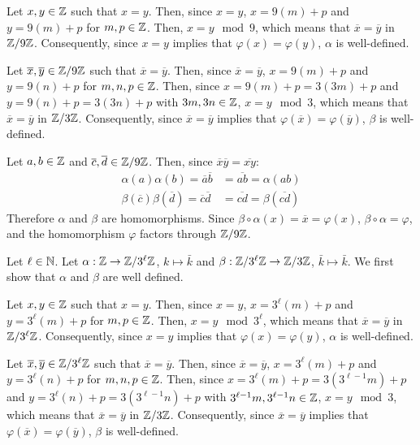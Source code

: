 \documentclass{article}
\begin{document}
Let $x, y \in \mathbb{Z}$ such that $x = y$. Then, since $x = y$, $x = 9\left(m\right) + p$ and $y = 9\left(m\right) + p$ for $m, p \in \mathbb{Z}$. Then, $x = y \mod 9$, which means that $\overline{x} = \overline{y}$ in $\mathbb{Z}/9\mathbb{Z}$. Consequently, since $x = y$ implies that $\varphi\left(x\right) = \varphi\left(y\right)$, $\alpha$ is well-defined.

Let $\overline{x}, \overline{y} \in \mathbb{Z}/9\mathbb{Z}$ such that $\overline{x} = \overline{y}$. Then, since $\overline{x} = \overline{y}$, $x = 9\left(m\right) + p$ and $y = 9\left(n\right) + p$ for $m, n, p \in \mathbb{Z}$. Then, since $x = 9\left(m\right) + p = 3\left(3m\right) + p$ and $y = 9\left(n\right) + p = 3\left(3n\right) + p$ with $3m, 3n \in \mathbb{Z}$, $x = y \mod 3$, which means that $\overline{x} = \overline{y}$ in $\mathbb{Z}/3\mathbb{Z}$. Consequently, since $\overline{x} = \overline{y}$ implies that $\varphi\left(\overline{x}\right) = \varphi\left(\overline{y}\right)$, $\beta$ is well-defined.

Let $a, b \in \mathbb{Z}$ and $\overline{c}, \overline{d} \in \mathbb{Z}/9\mathbb{Z}$. Then, since $\overline{x}\overline{y} = \overline{xy}$:
\begin{equation}
    \begin{split}
        \alpha\left(a\right)\alpha\left(b\right) = \overline{a}\overline{b} & = \overline{ab} = \alpha\left(ab\right) \\
        \beta\left(\overline{c}\right)\beta\left(\overline{d}\right) = \overline{c}\overline{d} & = \overline{cd} = \beta\left(\overline{cd}\right)
    \end{split}
\end{equation}
Therefore $\alpha$ and $\beta$ are homomorphisms. Since $\beta \circ \alpha \left(x\right) = \overline{x} = \varphi\left(x\right)$, $\beta \circ \alpha = \varphi$, and the homomorphism $\varphi$ factors through $\mathbb{Z}/9\mathbb{Z}$.

Let $\ell \in \mathbb{N}$. Let $\alpha: \mathbb{Z} \to \mathbb{Z}/3^\ell\mathbb{Z}$, $k \mapsto \bar k$ and $\beta: \mathbb{Z}/3^\ell\mathbb{Z} \to \mathbb{Z}/3\mathbb{Z}$, $\bar k \mapsto \bar k$. We first show that $\alpha$ and $\beta$ are well defined.

Let $x, y \in \mathbb{Z}$ such that $x = y$. Then, since $x = y$, $x = 3^\ell\left(m\right) + p$ and $y = 3^\ell\left(m\right) + p$ for $m, p \in \mathbb{Z}$. Then, $x = y \mod 3^\ell$, which means that $\overline{x} = \overline{y}$ in $\mathbb{Z}/3^\ell\mathbb{Z}$. Consequently, since $x = y$ implies that $\varphi\left(x\right) = \varphi\left(y\right)$, $\alpha$ is well-defined.

Let $\overline{x}, \overline{y} \in \mathbb{Z}/3^\ell\mathbb{Z}$ such that $\overline{x} = \overline{y}$. Then, since $\overline{x} = \overline{y}$, $x = 3^\ell\left(m\right) + p$ and $y = 3^\ell\left(n\right) + p$ for $m, n, p \in \mathbb{Z}$. Then, since $x = 3^\ell\left(m\right) + p = 3\left(3^{\ell-1}m\right) + p$ and $y = 3^\ell\left(n\right) + p = 3\left(3^{\ell-1}n\right) + p$ with $3^{\ell-1}m, 3^{\ell-1}n \in \mathbb{Z}$, $x = y \mod 3$, which means that $\overline{x} = \overline{y}$ in $\mathbb{Z}/3\mathbb{Z}$. Consequently, since $\overline{x} = \overline{y}$ implies that $\varphi\left(\overline{x}\right) = \varphi\left(\overline{y}\right)$, $\beta$ is well-defined.
\end{document}
